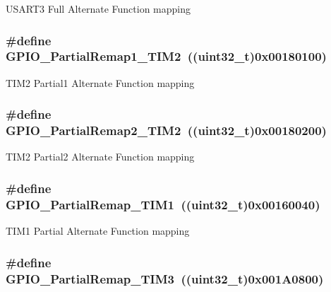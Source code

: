 \label{group__GPIO__Remap__define_gaa8831190b5b68e9f871955b791fa358b}
USART3 Full Alternate Function mapping \hypertarget{group__GPIO__Remap__define_ga7ad69d3e2643b2bfee4eebbea4a5b80e}{
\subsubsection[{GPIO\_\-PartialRemap1\_\-TIM2}]{\setlength{\rightskip}{0pt plus 5cm}\#define GPIO\_\-PartialRemap1\_\-TIM2~((uint32\_\-t)0x00180100)}}
\label{group__GPIO__Remap__define_ga7ad69d3e2643b2bfee4eebbea4a5b80e}
TIM2 Partial1 Alternate Function mapping \hypertarget{group__GPIO__Remap__define_ga42908e73dfc201d0a7b4ab0ed6f15eb7}{
\subsubsection[{GPIO\_\-PartialRemap2\_\-TIM2}]{\setlength{\rightskip}{0pt plus 5cm}\#define GPIO\_\-PartialRemap2\_\-TIM2~((uint32\_\-t)0x00180200)}}
\label{group__GPIO__Remap__define_ga42908e73dfc201d0a7b4ab0ed6f15eb7}
TIM2 Partial2 Alternate Function mapping \hypertarget{group__GPIO__Remap__define_ga0e94344776c53a76f6e9d933139c05a6}{
\subsubsection[{GPIO\_\-PartialRemap\_\-TIM1}]{\setlength{\rightskip}{0pt plus 5cm}\#define GPIO\_\-PartialRemap\_\-TIM1~((uint32\_\-t)0x00160040)}}
\label{group__GPIO__Remap__define_ga0e94344776c53a76f6e9d933139c05a6}
TIM1 Partial Alternate Function mapping \hypertarget{group__GPIO__Remap__define_gaaced3961a038fd8b41abfaf55d24f609}{
\subsubsection[{GPIO\_\-PartialRemap\_\-TIM3}]{\setlength{\rightskip}{0pt plus 5cm}\#define GPIO\_\-PartialRemap\_\-TIM3~((uint32\_\-t)0x001A0800)}}
